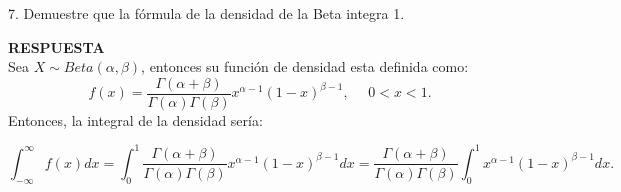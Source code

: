 \documentclass[11pt,letterpaper]{article}
\newcommand{\res}{\textbf{RESPUESTA}\\}
\begin{document}
7. Demuestre que la fórmula de la densidad de la Beta integra 1.

\res Sea $X\sim Beta(\alpha, \beta)$, entonces su función de densidad esta definida como:
$$f(x)=\frac{\Gamma(\alpha+\beta)}{\Gamma(\alpha)\Gamma(\beta)}x^{\alpha-1}(1-x)^{\beta-1},\ \ \ \ \ \ 0<x<1.$$
Entonces, la integral de la densidad sería:

$$\int_{-\infty}^{\infty}f(x)dx=\int_{0}^{1}\frac{\Gamma(\alpha+\beta)}{\Gamma(\alpha)\Gamma(\beta)}x^{\alpha-1}(1-x)^{\beta-1}dx=\frac{\Gamma(\alpha+\beta)}{\Gamma(\alpha)\Gamma(\beta)} \int_{0}^{1}x^{\alpha-1}(1-x)^{\beta-1}dx.$$
\end{document}
